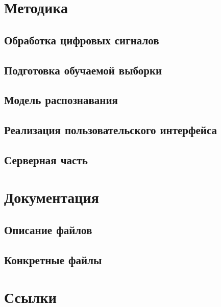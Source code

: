 \documentclass[14pt,a4paper]{article}
\begin{document}
\newpage

\section[Методика]{\huge Методика}
\subsection{Обработка цифровых сигналов}
\subsection{Подготовка обучаемой выборки}
\subsection{Модель распознавания}
\subsection{Реализация пользовательского интерфейса}
\subsection{Серверная часть}

\newpage

\section[Документация]{\huge Документация}
\subsection{Описание файлов}
\subsection{Конкретные файлы}

\newpage

\section[Ссылки]{\huge Ссылки}
\end{document}

